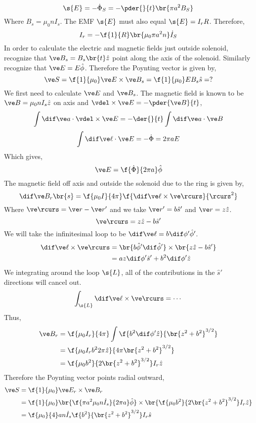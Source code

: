 \documentclass{article}
\begin{document}
\[ \s{E} = - \dot{\Phi}_S = - \pder{}{t}\br{\pi a^2 B_S} \]
Where $B_s = \mu_0 n I_s$. The EMF $\s{E}$ must also equal $\s{E} = I_r R$. Therefore,
\[ I_r = - \f{1}{R}\br{\mu_0 \pi a^2 n}\dot{I}_S \]
In order to calculate the electric and magnetic fields just outside solenoid, recognize that $\ve B_s = B_s\br{t} \hat{z}$ point along the axis of the solenoid. Similarly recognize that $\ve E = E \hat{\phi}$. Therefore the Poynting vector is given by,
\[ \ve S = \f{1}{\mu_0} \ve E \times \ve B_s = \f{1}{\mu_0} E B_{s} \hat{s} = ? \]
We first need to calculate $\ve E$ and $\ve B_s$. The magnetic field is known to be $\ve B = \mu_0 n I_s \hat{z}$ on axis and $\vdel \times \ve E = - \pder{\ve B}{t}$,
\[ \int \dif \ve a \cdot \vdel \times \ve E = - \der{}{t} \int \dif \ve a \cdot \ve B \]
\[ \int \dif \ve \ell \cdot \ve E = - \dot \Phi = 2 \pi a E \]
Which gives,
\[ \ve E = \f{\dot \Phi}{2\pi a}\hat{\phi} \]
The magnetic field off axis and outside the solenoid due to the ring is given by,
\[ \dif \ve B_r \br{s} = \f{\mu_0 I}{4 \pi} \f{\dif \ve \ell \times \ve \rcurs}{\rcurs^2} \]
Where $\ve \rcurs = \ve r - \ve r'$ and we take $\ve r ' = b \hat s '$ and $\ve r = z \hat z$.
\[ \ve \rcurs = z \hat z - b \hat s' \]
We will take the infinitesimal loop to be $\dif \ve \ell = b\dif \phi'\hat \phi'$.
\begin{align*}
\dif \ve \ell \times \ve \rcurs &= \br{b \hat \phi' \dif \hat \phi'}\times\br{z\hat z - b \hat s '} \\
&= a z \dif \phi' \hat s' + b^2 \dif \phi' \hat z
\end{align*}
We integrating around the loop $\s{L}$, all of the contributions in the $\hat{s}'$ directions will cancel out.
\[ \int_{\s{L}} \dif \ve \ell \times \ve \rcurs = \cdots \]
Thus,
\begin{align*}
\ve B_r &= \f{\mu_0 I_r}{4\pi} \int \f{b^2 \dif \phi' \hat z}{\br{z^2 + b^2}^{3/2}} \\
&= \f{\mu_0 I_r b^2 2 \pi \hat z}{4\pi \br{z^2 + b^2}^{3/2}} \\
&= \f{\mu_0 b^2}{2\br{z^2 + b^2}^{3/2}}I_r\hat z
\end{align*}
Therefore the Poynting vector points radial outward,
\begin{align*}
\ve S &= \f{1}{\mu_0}\ve E_r \times \ve B_r \\
&= \f{1}{\mu_0}\br{\f{\pi a^2 \mu_0 n \dot I_s}{2 \pi a} \hat \phi} \times \br{\f{\mu_0 b^2}{2\br{z^2 + b^2}^{3/2}}I_r\hat z} \\
&= \f{\mu_0}{4} a n \dot I_s \f{b^2}{\br{z^2 + b^2}^{3/2}} I_r \hat{s}
\end{align*}
\end{document}
